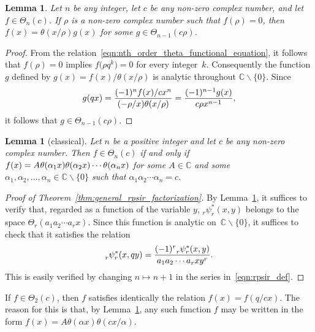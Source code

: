 \documentclass[pdftex]{sigma}
\numberwithin{equation}{section}
\newtheorem{Lemma}[Theorem]{Lemma}
\newcommand{\C}{\mathbb{C}}
\renewcommand{\sp}{\hspace{0.5pt}}
\begin{document}
\begin{Lemma} \label{lem:theta_root}
Let $n$ be any integer, let $c$ be any non-zero complex number, and let $f \in \Theta_n(c)$. If $\rho$ is a non-zero complex number such that $f(\rho)=0$, then $f(x) = \theta(x/\rho)g(x)$ for some $g \in \Theta_{n-1}(c\rho)$.
\end{Lemma}

\begin{proof}
From the relation~\eqref{eqn:nth_order_theta_functional_equation}, it follows that $f(\rho)=0$ implies $f\bigl(\rho q^k\bigr)=0$ for every integer~$k$. Consequently the function $g$ defined by $g(x) = f(x)/\theta(x/\rho)$ is analytic throughout $\C \backslash \{0\}$. Since
\[ g(qx) = {(-1)^n f(x) / cx^n \over (-\rho/x) \theta(x/\rho)} = {(-1)^{n-1} g(x) \over c\rho x^{n-1}}, \]
it follows that $g \in \Theta_{n-1}(c\rho)$.
\end{proof}

\begin{Lemma}[classical] \label{lem:theta_factorization}
Let $n$ be a positive integer and let $c$ be any non-zero complex number. Then $f \in \Theta_n(c)$ if and only if
$f(x) = A \sp \theta(\alpha_1x) \theta(\alpha_2x) \cdots \theta(\alpha_nx)$
for some $A \in \C$ and some~${\alpha_1, \alpha_2,\dots,\alpha_n \in \C\backslash\{0\}}$ such that $\alpha_1\alpha_2 \cdots \alpha_n = c$.
\end{Lemma}

\begin{proof}[Proof of Theorem~\ref{thm:general_rpsir_factorization}]
By Lemma~\ref{lem:theta_factorization}, it suffices to verify that, regarded as a function of the variable $y$, $_r^{}\psi_r^\ast(x,y)$ belongs to the space $\Theta_r(a_1a_2\cdots a_r x)$. Since this function is analytic on~${\C \backslash\{0\}}$, it suffices to check that it satisfies the relation
\[ _r^{}\psi_r^\ast(x,qy) = {(-1)^r {}_r^{}\psi_r^\ast(x,y) \over a_1a_2\cdots a_r x y^r}. \]
This is easily verified by changing $n \mapsto n+1$ in the series in~\eqref{eqn:rpsir_def}.
\end{proof}

\begin{Remark} \label{rmk:Theta2_relation}
If $f \in \Theta_2(c)$, then $f$ satisfies identically the relation $f(x) = f(q/cx)$. The reason for this is that, by Lemma~\ref{lem:theta_factorization}, any such function $f$ may be written in the form $f(x) = A\theta(\alpha x) \theta(cx/\alpha)$.
\end{Remark}
\end{document}
